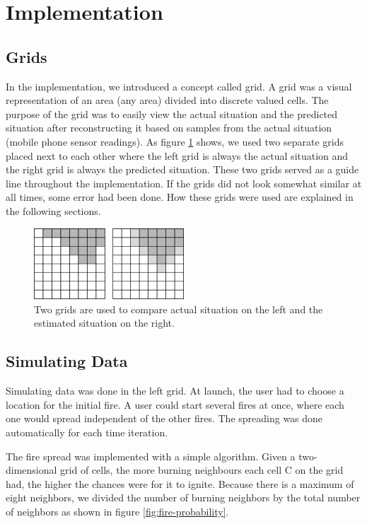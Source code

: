 \section{Implementation}
\subsection{Grids}
In the implementation, we introduced a concept called grid. A grid was a visual representation of an area (any area) divided into discrete valued cells. The purpose of the grid was to easily view the actual situation and the predicted situation after reconstructing it based on samples from the actual situation (mobile phone sensor readings). As figure \ref{fig:grid-concept} shows, we used two separate grids placed next to each other where the left grid is always the actual situation and the right grid is always the predicted situation. These two grids served as a guide line throughout the implementation. If the grids did not look somewhat similar at all times, some error had been done. How these grids were used are explained in the following sections.

\begin{figure}[here]
\centering
\includegraphics[width=0.5\textwidth]{solution/graphics/grid-concept.png}
\caption{Two grids are used to compare actual situation on the left and the estimated situation on the right.}
\label{fig:grid-concept}
\end{figure}

\subsection{Simulating Data}
Simulating data was done in the left grid. At launch, the user had to choose a location for the initial fire. A user could start several fires at once, where each one would spread independent of the other fires. The spreading was done automatically for each time iteration.

The fire spread was implemented with a simple algorithm. Given a two-dimensional grid of cells, the more burning neighbours each cell C on the grid had, the higher the chances were for it to ignite. Because there is a maximum of eight neighbors, we divided the number of burning neighbors by the total number of neighbors as shown in figure \ref{fig:fire-probability}.


